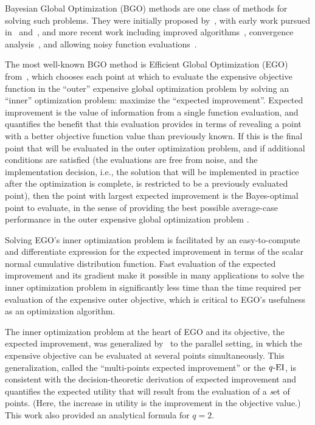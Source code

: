 \documentclass[paper=letter]{scrartcl}
\newcommand{\qEI}{\text{\textit q-EI}}
\begin{document}
Bayesian Global Optimization (BGO) methods are one class of methods for solving 
such problems. They were initially proposed by~\cite{kushner1964new}, with 
early work pursued in~\cite{MoTiZi78} and~\cite{mockus1989bayesian}, and more recent work including 
improved algorithms~\citep{boender1987bayesian, JoScWe98, HuAlNoZe06}, convergence analysis~\citep{Ca97,CaZi02, VaBe10}, and allowing noisy function evaluations~\citep{CaZi05,ViVaWa08,frazier2009knowledge, HuAlNoZe06}. 

The most well-known BGO method is Efficient Global Optimization (EGO)
from~\cite{JoScWe98}, which chooses each point at which to evaluate the expensive
objective function in the ``outer'' expensive global optimization problem by
solving an ``inner'' optimization problem: maximize the ``expected improvement''.
Expected improvement is the value of information \citep{Ho66} from a
single function evaluation, and quantifies the benefit that this evaluation provides in terms of revealing a point with a better objective function value than previously known.
If this is the final point that will be evaluated in the outer optimization
problem, and if additional conditions are satisfied (the evaluations are free
from noise, and the implementation decision, i.e., the solution that will be
implemented in practice after the optimization is complete, is restricted to be
a previously evaluated point), then 
the point with 
largest expected improvement is the Bayes-optimal point to evaluate, in the sense of
providing the best possible average-case performance in the outer expensive
global optimization problem \citep{FrazierWang2016}.

Solving EGO's inner optimization problem is facilitated by an
easy-to-compute and differentiate expression for the expected
improvement in terms of the scalar normal cumulative distribution function.
Fast evaluation of the expected improvement and its gradient make it possible
in many applications to solve the inner optimization problem in significantly less time than
the time required per evaluation of the expensive outer objective,
which is critical to EGO's usefulness as an optimization algorithm.

The inner optimization problem at the heart of EGO and its objective, the
expected improvement, was generalized by~\cite{GiLeCa08} to the parallel
setting, in which the expensive objective can be evaluated at several 
points simultaneously.  This generalization, called the ``multi-points expected improvement'' or the $\qEI$,
is consistent with the decision-theoretic derivation of expected improvement and 
quantifies the expected utility that will result from the evaluation of a {\textit set} of points.
(Here, the increase in utility is the improvement in the objective value.)
This work also provided an analytical formula for $q=2$.
\end{document}
